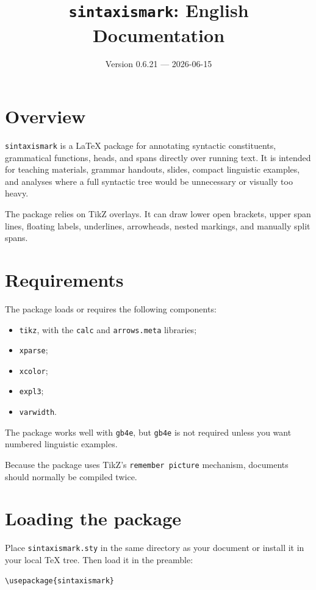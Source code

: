 \documentclass[11pt,a4paper]{article}
\title{\texttt{sintaxismark}: English Documentation}
\author{}
\date{Version 0.6.21 --- 2026-06-15}
\begin{document}
\maketitle

\section{Overview}

\texttt{sintaxismark} is a LaTeX package for annotating syntactic constituents, grammatical functions, heads, and spans directly over running text. It is intended for teaching materials, grammar handouts, slides, compact linguistic examples, and analyses where a full syntactic tree would be unnecessary or visually too heavy.

The package relies on TikZ overlays. It can draw lower open brackets, upper span lines, floating labels, underlines, arrowheads, nested markings, and manually split spans.

\section{Requirements}

The package loads or requires the following components:

\begin{itemize}
  \item \texttt{tikz}, with the \texttt{calc} and \texttt{arrows.meta} libraries;
  \item \texttt{xparse};
  \item \texttt{xcolor};
  \item \texttt{expl3};
  \item \texttt{varwidth}.
\end{itemize}

The package works well with \texttt{gb4e}, but \texttt{gb4e} is not required unless you want numbered linguistic examples.

Because the package uses TikZ's \texttt{remember picture} mechanism, documents should normally be compiled twice.

\section{Loading the package}

Place \texttt{sintaxismark.sty} in the same directory as your document or install it in your local TeX tree. Then load it in the preamble:

\begin{lstlisting}
\usepackage{sintaxismark}
\end{lstlisting}
\end{document}

